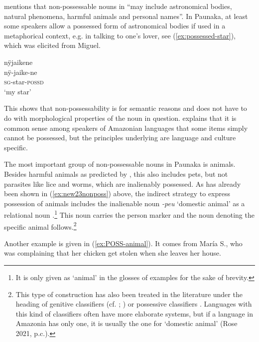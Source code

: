 \citet[82]{Aikhenvald1999} mentions that non-possessable nouns in  “may include astronomical bodies, natural phenomena, harmful animals and personal names”. %
In Paunaka, at least some speakers allow a possessed form of astronomical bodies if used in a metaphorical context, e.g. in talking to one’s lover, see (\ref{ex:possessed-star}), which was elicited from Miguel.

\ea\label{ex:possessed-star}
\begingl 
\glpreamble nÿjaikene\\
\gla nÿ-jaike-ne\\ 
\textsc{sg}-star-\textsc{possd}\\ 
\glft ‘my star’\\ 
\endgl
\trailingcitation{[mxx-e181017l]}
\xe

This shows that non-possessability is for semantic reasons and does not have to do with morphological properties of the noun in question. \citet[170]{Aikhenvald2012} explains that it is common sense among speakers of Amazonian languages that some items simply cannot be possessed, but the principles underlying are language and culture specific.

The most important group of non-possessable nouns in Paunaka is animals. Besides harmful animals as  predicted by \citet[82]{Aikhenvald1999}, this also includes pets, but not parasites like lice and worms, which are inalienably possessed. As has already been shown in (\ref{ex:new23nonposs}) above, the indirect strategy to express possession of animals includes the inalienable noun \textit{-peu} ‘domestic animal’ as a relational noun .\footnote{It is only given as ‘animal’ in the glosses of examples for the sake of brevity.} This noun carries the person marker and the noun denoting the specific animal follows.\footnote{This type of construction has also been treated in the literature under the heading of genitive classifiers (cf. \citealt[66]{Grinevald2000}; \citealt[283]{Campbell2012}) or possessive classifiers \citep[]{Fabre2014}. Languages with this kind of classifiers often have more elaborate systems, but if a language in Amazonia has only one, it is usually the one for ‘domestic animal’ (Rose 2021, p.c.).} 

Another example is given in (\ref{ex:POSS-animal}). It comes from María S., who was complaining that her chicken get stolen when she leaves her house.


